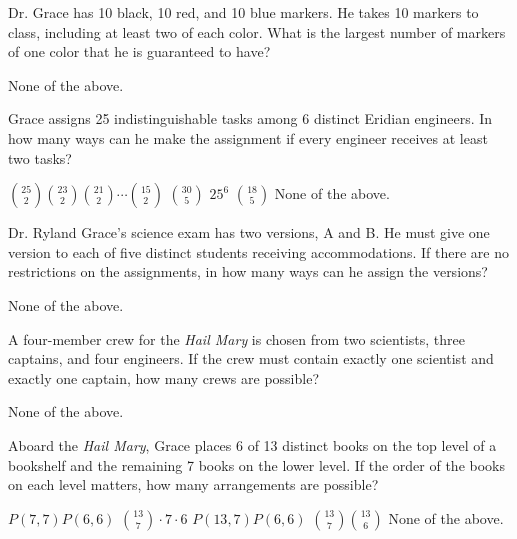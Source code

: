 \documentclass[11pt,addpoints]{exam}
\newcommand{\practiceWorkSpace}{\par\vspace{0.85in}}
\begin{document}
\begin{questions}
\newpage

\question[5] Dr. Grace has 10 black, 10 red, and 10 blue markers. He takes 10 markers to class, including at least two of each color. What is the largest number of markers of one color that he is guaranteed to have?
\begin{choices}
    \choice None of the above.
\end{choices}
\practiceWorkSpace

\question[5] Grace assigns 25 indistinguishable tasks among 6 distinct Eridian engineers. In how many ways can he make the assignment if every engineer receives at least two tasks?
\begin{choices}
    \choice $\binom{25}{2}\binom{23}{2}\binom{21}{2}\cdots\binom{15}{2}$
    \choice $\binom{30}{5}$
    \choice $25^6$
    \choice $\binom{18}{5}$
    \choice None of the above.
\end{choices}
\practiceWorkSpace

\question[5] Dr. Ryland Grace's science exam has two versions, A and B. He must give one version to each of five distinct students receiving accommodations. If there are no restrictions on the assignments, in how many ways can he assign the versions?
\begin{choices}
    \choice None of the above.
\end{choices}
\practiceWorkSpace

\question[5] A four-member crew for the \textit{Hail Mary} is chosen from two scientists, three captains, and four engineers. If the crew must contain exactly one scientist and exactly one captain, how many crews are possible?
\begin{choices}
    \choice None of the above.
\end{choices}
\practiceWorkSpace

\newpage

\question[5] Aboard the \textit{Hail Mary}, Grace places 6 of 13 distinct books on the top level of a bookshelf and the remaining 7 books on the lower level. If the order of the books on each level matters, how many arrangements are possible?
\begin{choices}
    \choice $P(7,7)P(6,6)$
    \choice $\binom{13}{7}\cdot7\cdot6$
    \choice $P(13,7)P(6,6)$
    \choice $\binom{13}{7}\binom{13}{6}$
    \choice None of the above.
\end{choices}
\practiceWorkSpace


\end{questions}
\end{document}
